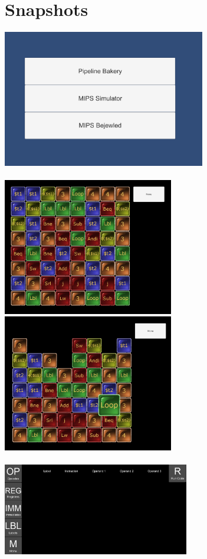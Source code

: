 \documentclass[12pt]{article}
\begin{document}
	\section{Snapshots}
	\includegraphics[height=6cm]{MainMenu.png}\\\\
	\includegraphics[height=6cm]{MIPSBejeweled.png}
	\includegraphics[height=6cm]{BejeweledHowTo.png}\\\\
	\includegraphics[height=4cm]{MIPSSimulatorStart.png}
\end{document}
